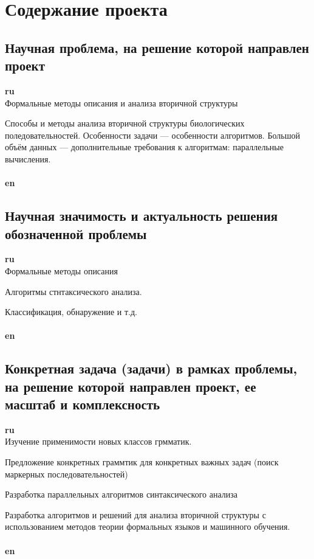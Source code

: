 \documentclass[12pt]{article}  %
\theoremstyle{remark}
\begin{document}
\section{Содержание проекта}

\subsection{Научная проблема, на решение которой направлен проект}

\textbf{ru}\\
Формальные методы описания и анализа вторичной структуры

Способы и методы анализа вторичной структуры биологических поледовательностей.
Особенности задачи --- особенности алгоритмов.
Большой объём данных --- дополнительные требования к алгоритмам: параллельные вычисления.
\\
\\
\textbf{en}\\



\subsection{Научная значимость и актуальность решения обозначенной проблемы}

\textbf{ru}\\
Формальные методы описания

Алгоритмы стнтаксического анализа.

Классификация, обнаружение и т.д.
\\
\\
\textbf{en}\\



\subsection{Конкретная задача (задачи) в рамках проблемы, на решение которой направлен проект, ее масштаб и комплексность}

\textbf{ru}\\
Изучение применимости новых классов грмматик.

Предложение конкретных граммтик для конкретных важных задач (поиск маркерных последовательностей)

Разработка параллельных алгоритмов синтаксического анализа

Разработка алгоритмов и решений для анализа вторичной структуры с использованием методов теории формальных языков и машинного обучения.
\\
\\
\textbf{en}\\
\end{document}

